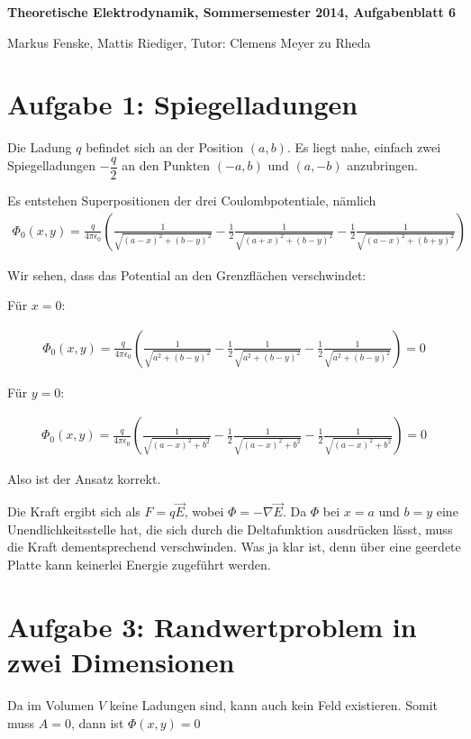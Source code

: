 \documentclass[a4paper,german,12pt,smallheadings]{scrartcl}
\begin{document}
\allowdisplaybreaks %
\begin{center}
\bfseries %
\sffamily %
\vspace{-40pt}
Theoretische Elektrodynamik, Sommersemester 2014, Aufgabenblatt 6

Markus Fenske, Mattis Riediger, Tutor: Clemens Meyer zu Rheda
\vspace{-10pt}
\end{center}

\section*{Aufgabe 1: Spiegelladungen}
Die Ladung $q$ befindet sich an der Position $(a,b)$. Es liegt nahe, einfach
zwei Spiegelladungen $-\dfrac{q}{2}$ an den Punkten $(-a, b)$ und $(a, -b)$
anzubringen.

Es entstehen Superpositionen der drei Coulombpotentiale, nämlich
\begin{align*}
  \Phi_0(x,y) = \frac{q}{4 \pi \epsilon_0} \left(
    \frac{1}{\sqrt{(a-x)^2 + (b-y)^2}} -
    \frac{1}{2} \frac{1}{\sqrt{(a+x)^2 + (b-y)^2}} -
    \frac{1}{2} \frac{1}{\sqrt{(a-x)^2 + (b+y)^2}}
  \right)
\end{align*}

Wir sehen, dass das Potential an den Grenzflächen verschwindet:

Für $x = 0$:

\begin{align*}
  \Phi_0(x,y) = \frac{q}{4 \pi \epsilon_0} \left(
    \frac{1}{\sqrt{a^2 + (b-y)^2}} -
    \frac{1}{2} \frac{1}{\sqrt{a^2 + (b-y)^2}} -
    \frac{1}{2} \frac{1}{\sqrt{a^2 + (b-y)^2}}
  \right) = 0
\end{align*}

Für $y = 0$:

\begin{align*}
  \Phi_0(x,y) = \frac{q}{4 \pi \epsilon_0} \left(
    \frac{1}{\sqrt{(a-x)^2 + b^2}} -
    \frac{1}{2} \frac{1}{\sqrt{(a-x)^2 + b^2}} -
    \frac{1}{2} \frac{1}{\sqrt{(a-x)^2 + b^2}}
  \right) = 0
\end{align*}

Also ist der Ansatz korrekt.

Die Kraft ergibt sich als $F = q \vec{E}$, wobei $\Phi = - \nabla \vec{E}$. Da
$\Phi$ bei $x=a$ und $b=y$ eine Unendlichkeitsstelle hat, die sich durch die
Deltafunktion ausdrücken lässt, muss die Kraft dementsprechend verschwinden.
Was ja klar ist, denn über eine geerdete Platte kann keinerlei Energie zugeführt
werden.

\section*{Aufgabe 3: Randwertproblem in zwei Dimensionen}

Da im Volumen $V$ keine Ladungen sind, kann auch kein Feld existieren. Somit
muss $A=0$, dann ist $\Phi(x,y) = 0$
\end{document}
